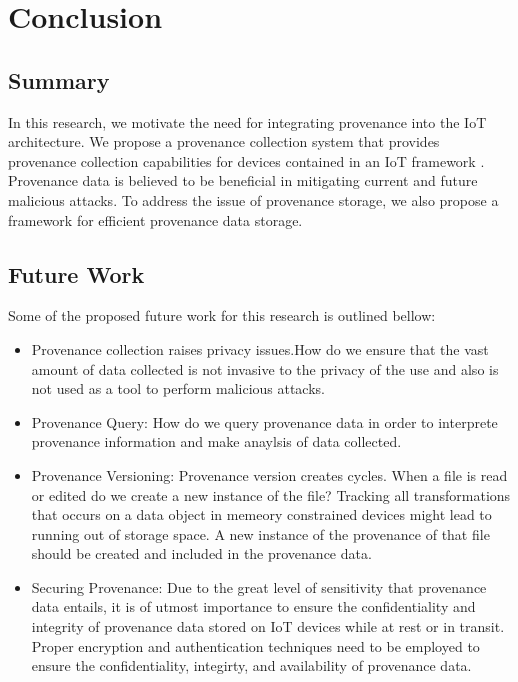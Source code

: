 
\chapter{Conclusion}

\section{Summary}
In this research, we motivate the need for integrating provenance into the IoT architecture. We propose a provenance collection system that provides provenance collection capabilities for devices contained in an IoT framework . Provenance data is believed to be beneficial in mitigating current and future malicious attacks. To address the issue of provenance storage, we also propose a framework for efficient provenance data storage.

\section{Future Work}

Some of the proposed future work for this research is outlined bellow:
\begin{itemize}

\item Provenance collection raises privacy issues.How do we ensure that the vast amount of data collected is not invasive to the privacy of the use and also is not used as a tool to perform malicious attacks.

\item Provenance Query: How do we query provenance data in order to interprete provenance information and make anaylsis of data collected.

\item Provenance Versioning: Provenance version creates cycles. When a file is read or edited do we create a new instance of the file? Tracking all transformations that occurs on a data object in memeory constrained devices might lead to running out of storage space. A new instance of the provenance of that file should be created and included in the provenance data.

\item Securing Provenance: Due to the great level of sensitivity that  provenance data entails, it is of utmost importance to ensure the confidentiality and integrity of provenance data stored on IoT devices while at rest or in transit. Proper encryption and authentication techniques need to be employed to ensure the confidentiality, integirty, and availability of provenance data.

\end{itemize}

